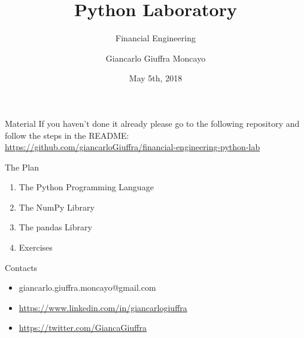 \documentclass{beamer}
\title{Python Laboratory}
\subtitle{Financial Engineering}
\date{May 5th, 2018}
\author{Giancarlo Giuffra Moncayo}
\institute{Politecnico di Milano}
\begin{document}
  \maketitle

  \begin{frame}{Material}
   If you haven't done it already please go to the following repository and follow the steps in the README:\\
   \vspace{1cm}
   \footnotesize{\url{https://github.com/giancarloGiuffra/financial-engineering-python-lab}}
  \end{frame}
  
  \begin{frame}{The Plan}
   \begin{enumerate}
   \item<1-> The Python Programming Language
   \item<2-> The NumPy Library
   \item<3-> The pandas Library
   \item<4-> Exercises
   \end{enumerate}
  \end{frame}
  
  \begin{frame}{Contacts}
   \begin{itemize}
   \item[\faEnvelope] giancarlo.giuffra.moncayo@gmail.com
   \item[\faLinkedin] \url{https://www.linkedin.com/in/giancarlogiuffra}
   \item[\faTwitter] \url{https://twitter.com/GiancaGiuffra}
   \end{itemize}
  \end{frame}
  
\end{document}
